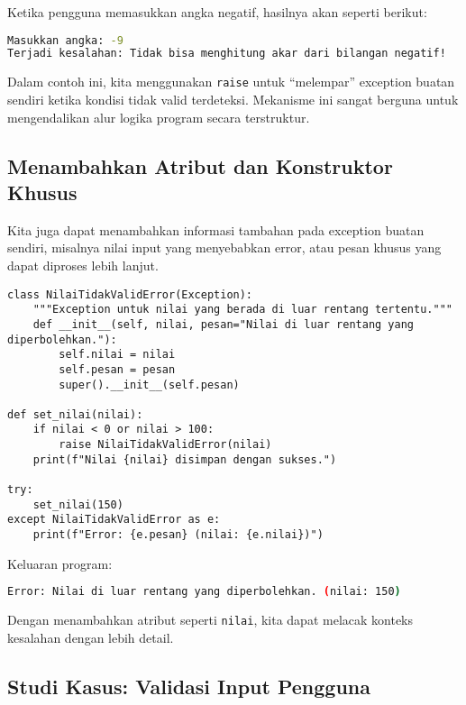 Ketika pengguna memasukkan angka negatif, hasilnya akan seperti berikut:

\begin{lstlisting}[language=bash]
Masukkan angka: -9
Terjadi kesalahan: Tidak bisa menghitung akar dari bilangan negatif!
\end{lstlisting}

Dalam contoh ini, kita menggunakan \texttt{raise} untuk “melempar” exception buatan sendiri ketika kondisi tidak valid terdeteksi.  
Mekanisme ini sangat berguna untuk mengendalikan alur logika program secara terstruktur.

\subsection*{Menambahkan Atribut dan Konstruktor Khusus}

Kita juga dapat menambahkan informasi tambahan pada exception buatan sendiri, misalnya nilai input yang menyebabkan error, atau pesan khusus yang dapat diproses lebih lanjut.

\begin{lstlisting}[style=PythonStyle, caption={Custom exception dengan atribut tambahan}]
class NilaiTidakValidError(Exception):
    """Exception untuk nilai yang berada di luar rentang tertentu."""
    def __init__(self, nilai, pesan="Nilai di luar rentang yang diperbolehkan."):
        self.nilai = nilai
        self.pesan = pesan
        super().__init__(self.pesan)

def set_nilai(nilai):
    if nilai < 0 or nilai > 100:
        raise NilaiTidakValidError(nilai)
    print(f"Nilai {nilai} disimpan dengan sukses.")

try:
    set_nilai(150)
except NilaiTidakValidError as e:
    print(f"Error: {e.pesan} (nilai: {e.nilai})")
\end{lstlisting}

Keluaran program:

\begin{lstlisting}[language=bash]
Error: Nilai di luar rentang yang diperbolehkan. (nilai: 150)
\end{lstlisting}

Dengan menambahkan atribut seperti \texttt{nilai}, kita dapat melacak konteks kesalahan dengan lebih detail.

\subsection*{Studi Kasus: Validasi Input Pengguna}

